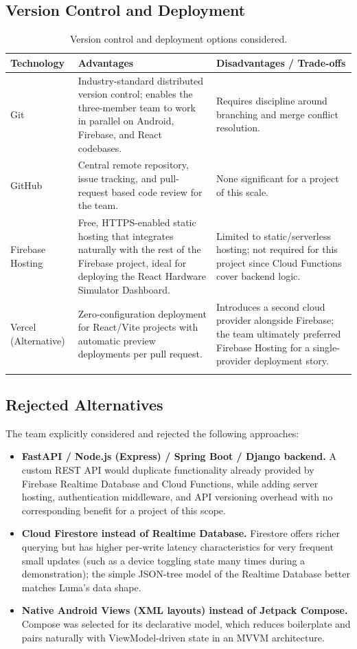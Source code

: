 \documentclass[11pt,a4paper]{article}
\begin{document}
\subsection{Version Control and Deployment}
\begin{longtable}{@{}p{3.6cm}p{5.2cm}p{4.2cm}@{}}
\toprule
\textbf{Technology} & \textbf{Advantages} & \textbf{Disadvantages / Trade-offs} \\
\midrule
\endhead
Git & Industry-standard distributed version control; enables the three-member team to work in parallel on Android, Firebase, and React codebases. & Requires discipline around branching and merge conflict resolution. \\
GitHub & Central remote repository, issue tracking, and pull-request based code review for the team. & None significant for a project of this scale. \\
Firebase Hosting & Free, HTTPS-enabled static hosting that integrates naturally with the rest of the Firebase project, ideal for deploying the React Hardware Simulator Dashboard. & Limited to static/serverless hosting; not required for this project since Cloud Functions cover backend logic. \\
Vercel (Alternative) & Zero-configuration deployment for React/Vite projects with automatic preview deployments per pull request. & Introduces a second cloud provider alongside Firebase; the team ultimately preferred Firebase Hosting for a single-provider deployment story. \\
\bottomrule
\caption{Version control and deployment options considered.}
\label{tab:devops-tech}
\end{longtable}

\subsection{Rejected Alternatives}
The team explicitly considered and rejected the following approaches:
\begin{itemize}
    \item \textbf{FastAPI / Node.js (Express) / Spring Boot / Django backend.} A custom REST API would duplicate functionality already provided by Firebase Realtime Database and Cloud Functions, while adding server hosting, authentication middleware, and API versioning overhead with no corresponding benefit for a project of this scope.
    \item \textbf{Cloud Firestore instead of Realtime Database.} Firestore offers richer querying but has higher per-write latency characteristics for very frequent small updates (such as a device toggling state many times during a demonstration); the simple JSON-tree model of the Realtime Database better matches Luma's data shape.
    \item \textbf{Native Android Views (XML layouts) instead of Jetpack Compose.} Compose was selected for its declarative model, which reduces boilerplate and pairs naturally with ViewModel-driven state in an MVVM architecture.
\end{itemize}
\end{document}
